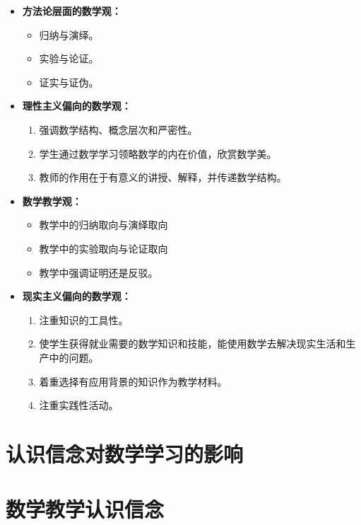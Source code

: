 \begin{multicols}{2}
\begin{itemize}
    \item \textbf{方法论层面的数学观：}
    \begin{itemize}
        \item 归纳与演绎。
        \item 实验与论证。
        \item 证实与证伪。
    \end{itemize}
    \item \textbf{理性主义偏向的数学观：}
    \begin{enumerate}
        \item 强调数学结构、概念层次和严密性。
        \item 学生通过数学学习领略数学的内在价值，欣赏数学美。
        \item 教师的作用在于有意义的讲授、解释，并传递数学结构。
    \end{enumerate}
\end{itemize}
\columnbreak
\begin{itemize}
    \item \textbf{数学教学观：}
    \begin{itemize}
        \item 教学中的归纳取向与演绎取向
        \item 教学中的实验取向与论证取向
        \item 教学中强调证明还是反驳。
    \end{itemize}
    \item \textbf{现实主义偏向的数学观：}
    \begin{enumerate}
        \item 注重知识的工具性。
        \item 使学生获得就业需要的数学知识和技能，能使用数学去解决现实生活和生产中的问题。
        \item 着重选择有应用背景的知识作为教学材料。
        \item 注重实践性活动。
    \end{enumerate}
\end{itemize}
\end{multicols}


\section{认识信念对数学学习的影响}

\section{数学教学认识信念}



